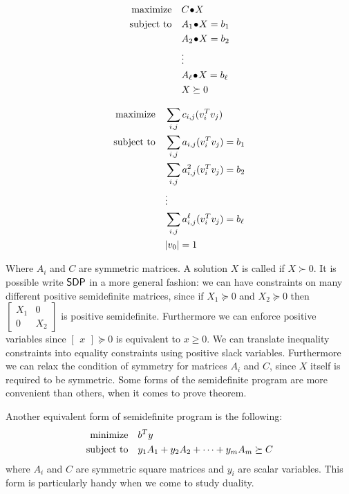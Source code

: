\documentclass[a4paper,twoside,justified]{tufte-handout}
\begin{document}
\begin{figure}
\begin{minipage}[t]{0.5\textwidth}
\begin{alignat*}{2}
  \maximize \pointwiseprod{C}{X}\\
  \subjectto \pointwiseprod{A_{1}}{X} = b_{1}\\
  & \pointwiseprod{A_{2}}{X} = b_{2}\\
  & \vdots \\
  & \pointwiseprod{A_{\ell}}{X} = b_{\ell}\\
  & X \succeq 0
\end{alignat*}
\end{minipage}
\begin{minipage}[t]{0.5\textwidth}
\begin{alignat*}{2}
  \text{maximize}\hspace{1em}& \sum_{i,j}c_{i,j} (v_{i}^{T}v_{j}) \\
  \text{subject to}\hspace{1em}& \sum_{i,j} a_{i,j} (v^{T}_{i}v_{j})= b_{1}\\
  & \sum_{i,j} a^{2}_{i,j} (v^{T}_{i}v_{j})= b_{2}\\
  & \vdots \\
  & \sum_{i,j} a^{\ell}_{i,j} (v^{T}_{i}v_{j})= b_{\ell}\\
  & |v_{0}| = 1
\end{alignat*}
\end{minipage}
\end{figure}
%
Where $ A_i $ and $ C $ are symmetric matrices.  
%
A solution $X$ is called  if $ X
\succ 0 $.
%
It is possible write
$\mathsf{SDP}$ in a more general fashion: we can have constraints on many
different positive semidefinite matrices, since if $ X_{1}\succeq 0 $
and $ X_{2} \succeq 0$ then $ \begin{bmatrix}
  X_{1} & 0 \\
  0 & X_{2}
\end{bmatrix} $ is positive semidefinite. Furthermore we can enforce
positive variables since $ \begin{bmatrix}
  x
\end{bmatrix} \succeq 0$ is equivalent to $ x \geq 0$. We can
translate inequality constraints into equality constraints using
positive slack variables. Furthermore we can relax the condition of
symmetry for matrices $ A_{i} $ and $ C $, since $ X $ itself is
required to be symmetric. Some forms of the semidefinite program are
more convenient than others, when it comes to prove theorem.

Another equivalent form of semidefinite program is the following:
\begin{alignat*}{2}
  \text{minimize}\hspace{1em}& b^{T}y\\
  \text{subject to}\hspace{1em}& y_{1}A_{1} + y_{2}A_{2} + \cdots + y_{m}A_{m} \succeq C
\end{alignat*} 
where $ A_{i} $ and $ C $ are symmetric square matrices and $ y_{i} $
are scalar variables. This form is particularly handy when we come to
study duality.
\end{document}
